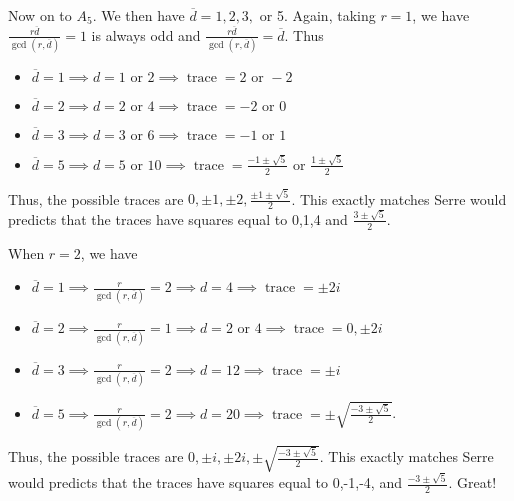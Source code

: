\documentclass[11pt]{amsart}
\theoremstyle{plain}
\theoremstyle{definition}
\DeclareMathOperator{\tr}{trace}
\renewcommand{\[}{\left[}
\renewcommand{\]}{\right]}
\newcommand{\dbar}{\overline{d}}
\begin{document}
Now on to $A_5$.  We then have $\dbar = 1,2,3,$ or 5. Again, taking $r=1$,
we have $\frac{r \dbar}{\gcd(r,\dbar)} = 1$ is always odd and $\frac{r \dbar}{\gcd(r,\dbar)} = \dbar$.  Thus
\begin{itemize}
\item $\dbar = 1 \implies d = 1 \text{~or~} 2 \implies \tr = 2 \text{~or~} -2$
\item $\dbar = 2 \implies d = 2 \text{~or~} 4 \implies \tr = -2 \text{~or~} 0$
\item $\dbar = 3 \implies d = 3 \text{~or~} 6 \implies \tr = -1 \text{~or~} 1$
\item $\dbar = 5 \implies d = 5 \text{~or~} 10 \implies \tr = \frac{-1 \pm \sqrt{5}}{2} \text{~or~} \frac{1 \pm \sqrt{5}}{2} $
\end{itemize}
Thus, the possible traces are $0, \pm 1, \pm 2, \frac{\pm 1 \pm \sqrt{5}}{2}$.  This exactly matches Serre would predicts that the traces have squares equal to 0,1,4 and $\frac{3 \pm \sqrt{5}}{2}$.

When $r = 2$, we have
\begin{itemize}
\item $\dbar = 1 \implies \frac{r}{\gcd(r,\dbar)} = 2 \implies d = 4 \implies \tr = \pm 2i$
\item $\dbar = 2 \implies \frac{r}{\gcd(r,\dbar)} = 1 \implies d = 2 \text{~or~} 4 \implies \tr = 0, \pm 2i$
\item $\dbar = 3 \implies \frac{r}{\gcd(r,\dbar)} = 2 \implies d = 12 \implies \tr = \pm i$
\item $\dbar = 5 \implies \frac{r}{\gcd(r,\dbar)} = 2 \implies d = 20 \implies \tr = \pm \sqrt{\frac{-3 \pm \sqrt{5}}{2}}$.
\end{itemize}
Thus, the possible traces are $0, \pm i, \pm 2i, \pm \sqrt{\frac{-3 \pm \sqrt{5}}{2}}$.  This exactly matches Serre would predicts that the traces have squares equal to 0,-1,-4, and $\frac{-3 \pm \sqrt{5}}{2}$.  Great!
\end{document}
